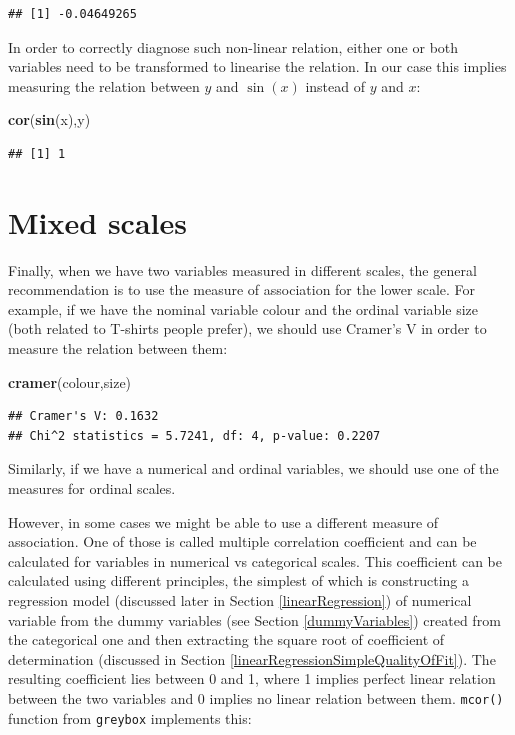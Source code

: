 \documentclass[
]{book}
\newenvironment{Shaded}{\begin{snugshade}}{\end{snugshade}}
\newcommand{\KeywordTok}[1]{\textcolor[rgb]{0.13,0.29,0.53}{\textbf{#1}}}
\newcommand{\NormalTok}[1]{#1}
\theoremstyle{definition}
\theoremstyle{definition}
\theoremstyle{definition}
\theoremstyle{definition}
\theoremstyle{remark}
\begin{document}
\begin{verbatim}
## [1] -0.04649265
\end{verbatim}

In order to correctly diagnose such non-linear relation, either one or both variables need to be transformed to linearise the relation. In our case this implies measuring the relation between \(y\) and \(\sin(x)\) instead of \(y\) and \(x\):

\begin{Shaded}
\begin{Highlighting}[]
\KeywordTok{cor}\NormalTok{(}\KeywordTok{sin}\NormalTok{(x),y)}
\end{Highlighting}
\end{Shaded}

\begin{verbatim}
## [1] 1
\end{verbatim}

\hypertarget{correlationsMixed}{%
\section{Mixed scales}\label{correlationsMixed}}

Finally, when we have two variables measured in different scales, the general recommendation is to use the measure of association for the lower scale. For example, if we have the nominal variable colour and the ordinal variable size (both related to T-shirts people prefer), we should use Cramer's V in order to measure the relation between them:

\begin{Shaded}
\begin{Highlighting}[]
\KeywordTok{cramer}\NormalTok{(colour,size)}
\end{Highlighting}
\end{Shaded}

\begin{verbatim}
## Cramer's V: 0.1632
## Chi^2 statistics = 5.7241, df: 4, p-value: 0.2207
\end{verbatim}

Similarly, if we have a numerical and ordinal variables, we should use one of the measures for ordinal scales.

However, in some cases we might be able to use a different measure of association. One of those is called multiple correlation coefficient and can be calculated for variables in numerical vs categorical scales. This coefficient can be calculated using different principles, the simplest of which is constructing a regression model (discussed later in Section \ref{linearRegression}) of numerical variable from the dummy variables (see Section \ref{dummyVariables}) created from the categorical one and then extracting the square root of coefficient of determination (discussed in Section \ref{linearRegressionSimpleQualityOfFit}). The resulting coefficient lies between 0 and 1, where 1 implies perfect linear relation between the two variables and 0 implies no linear relation between them. \texttt{mcor()} function from \texttt{greybox} implements this:
\end{document}
